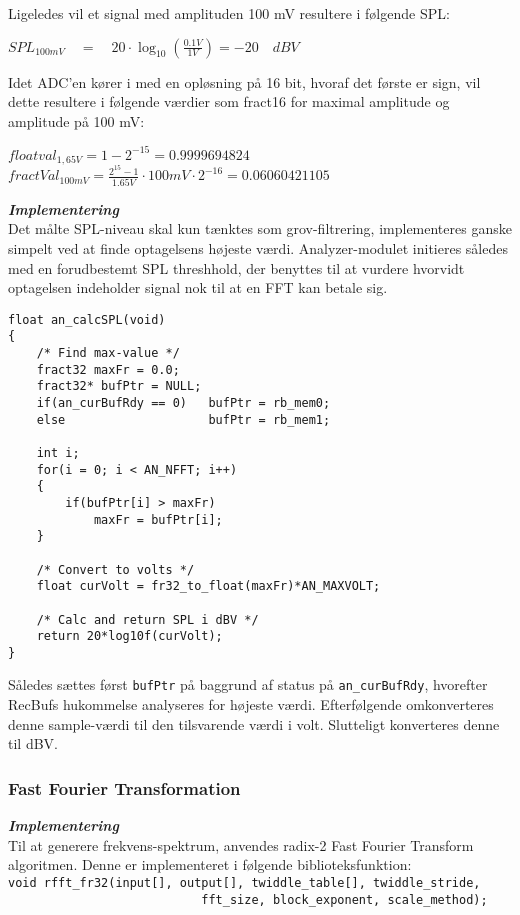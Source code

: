 Ligeledes vil et signal med amplituden 100 mV resultere i følgende SPL:
\begin{center}
${ SPL }_{ 100mV }\quad =\quad 20\cdot \log _{ 10 }{ \left( \frac { 0.1V }{ 1V }  \right)  } =-20\quad dBV$
\end{center}

Idet ADC'en kører i med en opløsning på 16 bit, hvoraf det første er sign, vil dette resultere i følgende værdier som fract16 for maximal amplitude og amplitude på 100 mV:
\begin{center}
${ floatval }_{ 1,65V }=1-{ 2 }^{ -15 }=0.9999694824$ \\
$fractVal_{ 100mV }=\frac { { 2 }^{ 15 }-1 }{ 1.65V } \cdot 100mV\cdot { 2 }^{ -16 }=0.06060421105$
\end{center}

\textbf{\textit{Implementering}} \\
Det målte SPL-niveau skal kun tænktes som grov-filtrering, implementeres ganske simpelt ved at finde optagelsens højeste værdi. Analyzer-modulet initieres således med en forudbestemt SPL threshhold, der benyttes til at vurdere hvorvidt optagelsen indeholder signal nok til at en FFT kan betale sig.
\begin{verbatim}
float an_calcSPL(void)
{
    /* Find max-value */
    fract32 maxFr = 0.0;
    fract32* bufPtr = NULL;
    if(an_curBufRdy == 0)   bufPtr = rb_mem0;
    else                    bufPtr = rb_mem1;
	
    int i;
    for(i = 0; i < AN_NFFT; i++)
    {
        if(bufPtr[i] > maxFr)
            maxFr = bufPtr[i];
    }
    
    /* Convert to volts */
    float curVolt = fr32_to_float(maxFr)*AN_MAXVOLT;
	
    /* Calc and return SPL i dBV */
    return 20*log10f(curVolt);
}
\end{verbatim}
Således sættes først \verb+bufPtr+ på baggrund af status på \verb+an_curBufRdy+, hvorefter RecBufs hukommelse analyseres for højeste værdi. Efterfølgende omkonverteres denne sample-værdi til den tilsvarende værdi i volt. Slutteligt konverteres denne til dBV.

\subsubsection{Fast Fourier Transformation}
\textbf{\textit{Implementering}} \\
Til at generere frekvens-spektrum, anvendes radix-2 Fast Fourier Transform algoritmen. Denne er implementeret i følgende biblioteksfunktion: \\
\verb+void rfft_fr32(input[], output[], twiddle_table[], twiddle_stride, + \\
\verb+                           fft_size, block_exponent, scale_method);+

